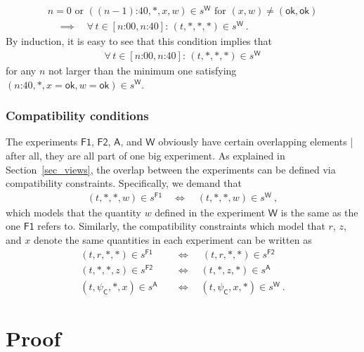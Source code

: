 \documentclass{article}
\theoremstyle{plain}
\theoremstyle{definition}
\newcommand*{\Friendone}{\mathsf{F1}}
\newcommand*{\Friendtwo}{\mathsf{F2}}
\newcommand*{\Assistant}{\mathsf{A}}
\newcommand*{\Wigner}{\mathsf{W}}
\newcommand*{\Coin}{\mathsf{C}}
\newcommand*{\ok}{\mathsf{ok}}
\begin{document}
\begin{multline} \label{eq_alwaysrepeat}
    n=0   \text{ or } (\text{$(n-1)$:40}, *, x, w) \in s^{\Wigner} \text{ for $(x, w) \neq (\ok, \ok)$}  \\ \quad \implies \quad \forall \, t \in [\text{$n$:00}, \text{$n$:40}] :\,  (t, *, *, *) \in s^{\Wigner}  \ .
 \end{multline}
 By induction, it is easy to see that this condition implies that
 \begin{align}\label{eq_repetitionimplication}
   \forall \, t \in [\text{$n$:00}, \text{$n$:40}] : \,  (t, *, *, *) \in s^{\Wigner}
 \end{align}
 for any $n$ not larger than the minimum one satisfying $(\text{$n$:40}, *, x = \ok, w = \ok) \in s^{\Wigner}$.


\subsubsection*{Compatibility conditions}

The experiments $\Friendone$, $\Friendtwo$, $\Assistant$, and $\Wigner$ obviously have certain overlapping elements | after all, they are all part of one big experiment. As explained in Section~\ref{sec_views}, the overlap between the experiments can be defined via compatibility constraints. Specifically, we demand that 
\begin{align} \label{eq_compFoneWigner}
   (t, *, *, w) \in s^{\Friendone} \quad \iff \quad (t, *, *, w) \in s^{\Wigner} \ ,
\end{align}
which models that the quantity $w$ defined in the experiment $\Wigner$ is the same as the one $\Friendone$ refers to. Similarly, the compatibility constraints which model that $r$, $z$, and $x$ denote the same quantities in each experiment can be written as 
\begin{align} \label{eq_compFoneFtwo}
   (t, r, *, *) \in s^{\Friendone} \quad & \iff \quad  \, (t, r, *, *) \in s^{\Friendtwo} \\ 
   \label{eq_compFtwoAssistant}  (t, *, *, z) \in s^{\Friendtwo} \quad & \iff \quad (t, *, z, *) \in s^{\Assistant}  \\
 \label{eq_compAssistantWigner} (t, \psi_{\Coin}, *, x) \in s^{\Assistant} \quad & \iff \quad  (t, \psi_{\Coin}, x, *) \in s^{\Wigner}      \ .
\end{align}

\section{Proof} \label{sec_proof}
\end{document}

